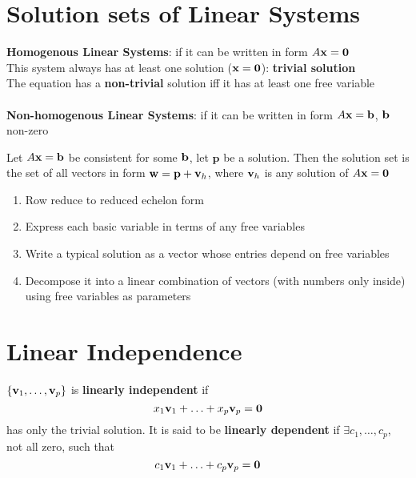 \documentclass{report}
\begin{document}
\section{Solution sets of Linear Systems}

\textbf{Homogenous Linear Systems}: if it can be written in form $A \mathbf{x} = \mathbf{0}$
\\This system always has at least one solution ($\mathbf{x} = \mathbf{0}$): \textbf{trivial solution}
\\The equation has a \textbf{non-trivial} solution iff it has at least one free variable
\\\\\textbf{Non-homogenous Linear Systems}: if it can be written in form $A \mathbf{x} = \mathbf{b}$, 
$\mathbf{b}$ non-zero

\begin{theorem}
    Let $A \mathbf{x} = \mathbf{b}$ be consistent for some $\mathbf{b}$, let $\mathbf{p}$ be a solution.
    Then the solution set is the set of all vectors in form $\mathbf{w} = \mathbf{p} + \mathbf{v}_h$, 
    where $\mathbf{v}_h$ is any solution of $A \mathbf{x} = \mathbf{0}$
\end{theorem}

\begin{tcolorbox}[colback=blue!5!white, colframe=blue!75!black, title=Writing a solution set in parametric vector form]
\begin{enumerate}
    \item Row reduce to reduced echelon form
    \item Express each basic variable in terms of any free variables
    \item Write a typical solution as a vector whose entries depend on free variables
    \item Decompose it into a linear combination of vectors (with numbers only inside) using free variables as parameters
\end{enumerate}
\end{tcolorbox}

\setcounter{section}{6}
\section{Linear Independence}
\begin{definition}
    $\{ \mathbf{v}_1, \ldots, \mathbf{v}_p\}$ is \textbf{linearly independent} if 
    \[
    x_1 \mathbf{v}_1 + \ldots + x_p \mathbf{v}_p = \mathbf{0}
    \]
    has only the trivial solution. It is said to be \textbf{linearly dependent} if $\exists c_1, \ldots, c_p$, not all zero, such that 
    \[
    c_1 \mathbf{v}_1 + \ldots + c_p \mathbf{v}_p = \mathbf{0}
    \]
\end{definition}
            
\end{document}
